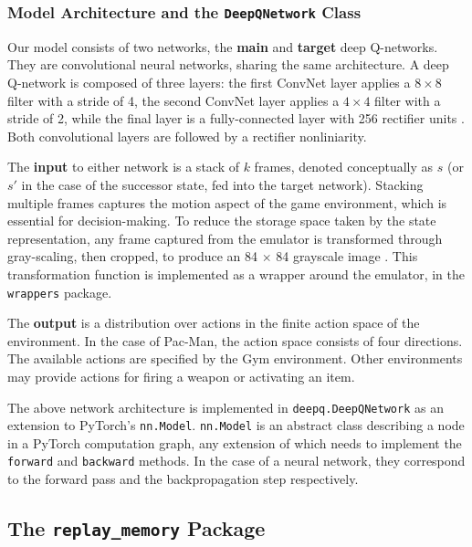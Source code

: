 \clearpage

\subsubsection{Model Architecture and the \texttt{DeepQNetwork} Class} \label{section:model-arch}


Our model consists of two networks, the \textbf{main} and \textbf{target} deep Q-networks.
They are convolutional neural networks, sharing the same architecture.
A deep Q-network is composed of three layers: the first ConvNet layer applies a $8 \times 8$ filter with a stride of 4, the second ConvNet layer applies a $4 \times 4$ filter with a stride of 2, while the final layer is a fully-connected layer with 256 rectifier units \cite{atari-dqn}.
Both convolutional layers are followed by a rectifier nonliniarity.

The \textbf{input} to either network is a stack of $k$ frames, denoted conceptually as $s$ (or $s'$ in the case of the successor state, fed into the target network).
Stacking multiple frames captures the motion aspect of the game environment, which is essential for decision-making.
To reduce the storage space taken by the state representation, any frame captured from the emulator is transformed through gray-scaling, then cropped, to produce an 84 $\times$ 84 grayscale image \cite{atari-dqn}.
This transformation function is implemented as a wrapper around the emulator, in the \texttt{wrappers} package.

The \textbf{output} is a distribution over actions in the finite action space of the environment.
In the case of Pac-Man, the action space consists of four directions.
The available actions are specified by the Gym environment.
Other environments may provide actions for firing a weapon or activating an item.

The above network architecture is implemented in \texttt{deepq.DeepQNetwork} as an extension to PyTorch’s \texttt{nn.Model}.
\texttt{nn.Model} is an abstract class describing a node in a PyTorch computation graph, any extension of which needs to implement the \texttt{forward} and \texttt{backward} methods.
In the case of a neural network, they correspond to the forward pass and the backpropagation step respectively.

\subsection{The \texttt{replay\_memory} Package} \label{section:replay-memory-implementation}

